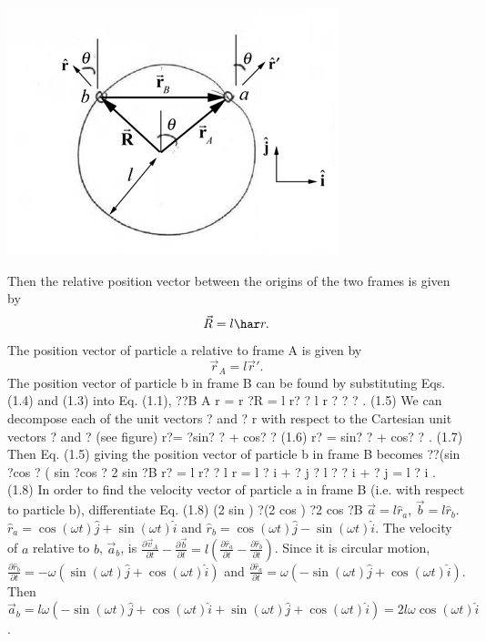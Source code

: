 \documentclass{esg8012pset}
\begin{document}
\begin{question}[Problem 2]
\begin{solution}
\begin{enumerate}[a.]
    \begin{center}\includegraphics{ps01_Solution_06_01}\end{center}
    Then the relative position vector between the origins of the two frames is given by 
    \begin{equation*} \vec R = l\har r.\end{equation*}
    The position vector of particle a relative to frame A is given by
    \begin{equation*} \vec r_A = l\vec r'. \end{equation*}
    The position vector of particle b in frame B can be found by substituting Eqs. (1.4) and (1.3) into
Eq. (1.1),
??B A r = r ?R = l r? ? l r
? ? ? . (1.5)
We can decompose each of the unit vectors ? and ? r with respect to the Cartesian unit vectors ?
and ? (see figure)
r?= ?sin? ? + cos? ? (1.6)
r? = sin? ? + cos? ? . (1.7)
Then Eq. (1.5) giving the position vector of particle b in frame B becomes
??(sin ?cos ? ( sin ?cos ? 2 sin ?B r? = l r? ? l r = l ? i + ? j ? l ? ? i + ? j = l ? i . (1.8)
In order to find the velocity vector of particle a in frame B (i.e. with respect to particle b),
differentiate Eq. (1.8)
(2 sin ) ?(2 cos ) ?2 cos ?B
        $\vec a = l\hat r_a$, $\vec b = l\hat r_b$.  %
    $\hat r_a = \cos(\omega t)\hat j + \sin(\omega t)\hat i$ and $\hat r_b = \cos(\omega t)\hat j -\sin(\omega t)\hat i$.  The velocity of $a$ relative to $b$, $\vec a_b$, is $\frac{\partial\vec v_A}{\partial t} - \frac{\partial \vec b}{\partial t} = l\left(\frac{\partial\hat r_a}{\partial t} - \frac{\partial \hat r_b}{\partial t}\right)$.  Since it is circular motion, $\frac{\partial \hat r_b}{\partial t} = -\omega(\sin(\omega t)\hat j + \cos(\omega t)\hat i)$ and $\frac{\partial \hat r_a}{\partial t} = \omega(-\sin(\omega t)\hat j + \cos(\omega t)\hat i)$.  Then $\vec a_b = l\omega\left(-\sin(\omega t)\hat j + \cos(\omega t)\hat i + \sin(\omega t)\hat j + \cos(\omega t)\hat i\right) = 2 l \omega \cos(\omega t)\hat i$.

\end{enumerate}
\end{solution}
\end{question}
\end{document}

